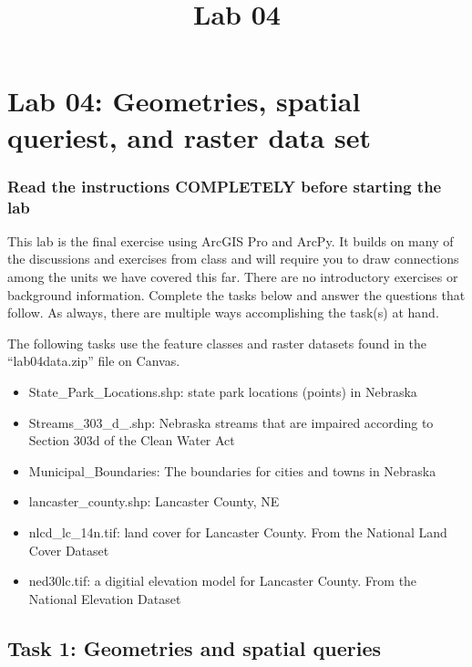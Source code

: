 \documentclass[]{article}
\title{Lab 04}
\author{}
\date{}
\makeatletter
\providecommand{\tightlist}{%
  \setlength{\itemsep}{0pt}\setlength{\parskip}{0pt}}
\renewcommand{\maketitle}{\bgroup\vspace*{-1cm}\setlength{\parindent}{0pt}
\begin{flushleft}
  \@author
  
  \@date
  
\end{flushleft}\egroup
}
\makeatother
\begin{document}
\maketitle

\hypertarget{lab-04-geometries-spatial-queriest-and-raster-data-set}{%
\section{Lab 04: Geometries, spatial queriest, and raster data
set}\label{lab-04-geometries-spatial-queriest-and-raster-data-set}}

\hypertarget{read-the-instructions-completely-before-starting-the-lab}{%
\subsubsection{Read the instructions COMPLETELY before starting the
lab}\label{read-the-instructions-completely-before-starting-the-lab}}

This lab is the final exercise using ArcGIS Pro and ArcPy. It builds on
many of the discussions and exercises from class and will require you to
draw connections among the units we have covered this far. There are no
introductory exercises or background information. Complete the tasks
below and answer the questions that follow. As always, there are
multiple ways accomplishing the task(s) at hand.

The following tasks use the feature classes and raster datasets found in
the ``lab04data.zip'' file on Canvas.

\begin{itemize}
\tightlist
\item
  State\_Park\_Locations.shp: state park locations (points) in Nebraska
\item
  Streams\_303\_d\_.shp: Nebraska streams that are impaired according to
  Section 303d of the Clean Water Act
\item
  Municipal\_Boundaries: The boundaries for cities and towns in Nebraska
\item
  lancaster\_county.shp: Lancaster County, NE
\item
  nlcd\_lc\_14n.tif: land cover for Lancaster County. From the National
  Land Cover Dataset
\item
  ned30lc.tif: a digitial elevation model for Lancaster County. From the
  National Elevation Dataset
\end{itemize}

\hypertarget{task-1-geometries-and-spatial-queries}{%
\subsection{Task 1: Geometries and spatial
queries}\label{task-1-geometries-and-spatial-queries}}
\end{document}
